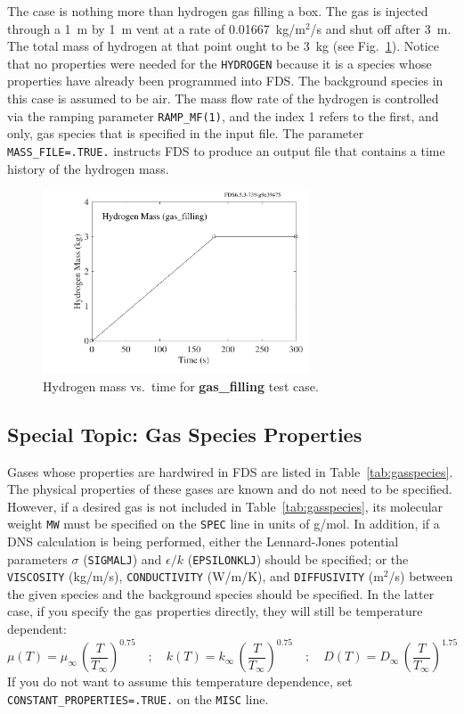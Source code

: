 \documentclass[11pt]{book}
\newcommand{\ct}{\tt\small}
\newcommand{\be}{\begin{equation}}
\newcommand{\ee}{\end{equation}}
\begin{document}
\noindent
The case is nothing more than hydrogen gas filling a box. The gas is injected through a 1~m by 1~m vent
at a rate of 0.01667~kg/m$^2$/s and shut off after 3~m. The total mass of hydrogen at that point ought to be
3~kg (see Fig.~\ref{gas_filling}). Notice that no properties were needed for the {\ct HYDROGEN} because it is
a species whose properties have already been programmed into FDS. The background species in this case is
assumed to be air. The mass flow rate of the hydrogen is controlled via the ramping parameter {\ct RAMP\_MF(1)}, and
the index 1 refers to the first, and only, gas species that is specified in the input file. The parameter
{\ct MASS\_FILE=.TRUE.} instructs FDS to produce an output file that contains a time history of the hydrogen mass.
\begin{figure}[h!]
\begin{center}
\includegraphics[width=3.1in]{SCRIPT_FIGURES/gas_filling_mass}
\end{center}
\caption[Example of gas filling.]{Hydrogen mass vs.~time for {\bf gas\_filling} test case.}
\label{gas_filling}
\end{figure}


\subsection{Special Topic: Gas Species Properties}

\label{gas_species_props}

Gases whose properties are hardwired in FDS are listed in
Table~\ref{tab:gasspecies}. The physical properties
of these gases are known and do not need to be specified. However, if a
desired gas is not included in Table~\ref{tab:gasspecies}, its
molecular weight {\ct MW} must be specified on the {\ct SPEC} line in units of g/mol.
In addition, if a DNS calculation is being performed, either
the Lennard-Jones potential parameters $\sigma$ ({\ct SIGMALJ}) and
$\epsilon/k$ ({\ct EPSILONKLJ}) should be specified; or
the {\ct VISCOSITY} (kg/m/s), {\ct CONDUCTIVITY} (W/m/K), and
{\ct DIFFUSIVITY} (m$^2$/s) between the given species
and the background species should be specified. In the latter case, if you specify the gas properties directly, they will still
be temperature dependent:
\be \mu(T) = \mu_\infty \, \left( \frac{T}{T_\infty} \right)^{0.75} \quad ; \quad
    k(T) = k_\infty \, \left( \frac{T}{T_\infty} \right)^{0.75} \quad ; \quad
    D(T) = D_\infty \, \left( \frac{T}{T_\infty} \right)^{1.75}   \ee
If you do not want to assume this temperature dependence, set {\ct CONSTANT\_PROPERTIES=.TRUE.} on the {\ct MISC} line.
\end{document}
